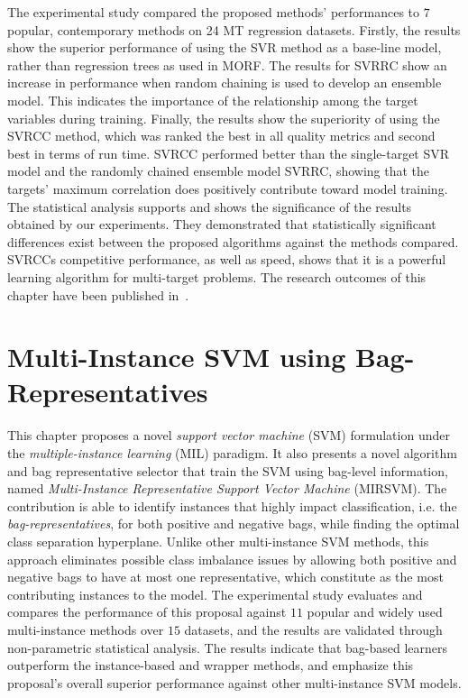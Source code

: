 \documentclass[reqno]{vcuthesis}
\numberwithin{equation}{chapter}
\begin{document}
\newpage

The experimental study compared the proposed methods' performances to $7$ popular, contemporary methods on 24 MT regression datasets. Firstly, the results show the superior performance of using the SVR method as a base-line model, rather than regression trees as used in MORF. The results for SVRRC show an increase in performance when random chaining is used to develop an ensemble model. This indicates the importance of the relationship among the target variables during training. Finally, the results show the superiority of using the SVRCC method, which was ranked the best in all quality metrics and second best in terms of run time. SVRCC performed better than the single-target SVR model and the randomly chained ensemble model SVRRC, showing that the targets' maximum correlation does positively contribute toward model training. The statistical analysis supports and shows the significance of the results obtained by our experiments. They demonstrated that statistically significant differences exist between the proposed algorithms against the methods compared. SVRCCs competitive performance, as well as speed, shows that it is a powerful learning algorithm for multi-target problems. The research outcomes of this chapter have been published in~\cite{melki2017multi}.

\chapter{Multi-Instance SVM using Bag-Representatives} \label{chap:mirsvm}
This chapter proposes a novel \textit{support vector machine} (SVM) formulation under the \textit{multiple-instance learning} (MIL) paradigm. It also presents a novel algorithm and bag representative selector that train the SVM using bag-level information, named \textit{Multi-Instance Representative Support Vector Machine} (MIRSVM). The contribution is able to identify instances that highly impact classification, i.e. the \textit{bag-representatives}, for both positive and negative bags, while finding the optimal class separation hyperplane. Unlike other multi-instance SVM methods, this approach eliminates possible class imbalance issues by allowing both positive and negative bags to have at most one representative, which constitute as the most contributing instances to the model. The experimental study evaluates and compares the performance of this proposal against $11$ popular and widely used multi-instance methods over $15$ datasets, and the results are validated through non-parametric statistical analysis. The results indicate that bag-based learners outperform the instance-based and wrapper methods, and emphasize this proposal's overall superior performance against other multi-instance SVM models. 
\end{document}
